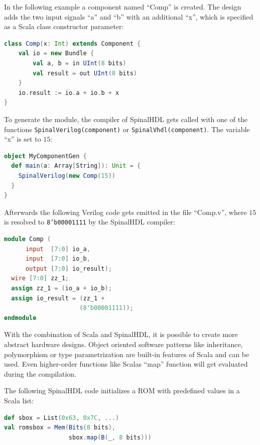 \documentclass[twoside,twocolumn]{article}
\newcommand{\code}[1]{\texttt{#1}}
\begin{document}
In the following example a component named ``Comp'' is created. The
design adds the two input signals ``a'' and ``b'' with an additional
``x'', which is specified as a Scala class constructor parameter: 
\begin{lstlisting}[language=scala]
class Comp(x: Int) extends Component {
    val io = new Bundle {
        val a, b = in UInt(8 bits)
        val result = out UInt(8 bits)
    }
    io.result := io.a + io.b + x
}
\end{lstlisting}
To generate the module, the compiler of SpinalHDL gets called with one of
the functions \code{SpinalVerilog(component)} or
\code{SpinalVhdl(component)}. The variable ``x'' is set to $15$:
\begin{lstlisting}[language=scala]
object MyComponentGen {
  def main(a: Array[String]): Unit = {
    SpinalVerilog(new Comp(15))
  }
}
\end{lstlisting}
Afterwards the following Verilog code gets emitted in the file
``Comp.v'', where $15$ is resolved to \code{8’b00001111} by the
SpinalHDL compiler:
\begin{lstlisting}[language=verilog]
module Comp (
      input  [7:0] io_a,
      input  [7:0] io_b,
      output [7:0] io_result);
  wire [7:0] zz_1;
  assign zz_1 = (io_a + io_b);
  assign io_result = (zz_1 + 
                     (8'b00001111));
endmodule
\end{lstlisting}
With the combination of Scala and SpinalHDL, it is possible to create
more abstract hardware designs. Object
oriented software patterns like inheritance, polymorphism or type
parametrization are built-in features of Scala and can be used. 
Even higher-order functions like Scalas ``map''
function will get evaluated during the compilation.

The following SpinalHDL code initializes a ROM with predefined values in
a Scala list:
\begin{lstlisting}[language=scala]
def sbox = List(0x63, 0x7C, ...)
val romsbox = Mem(Bits(8 bits), 
                  sbox.map(B(_, 8 bits)))
\end{lstlisting}
\end{document}
